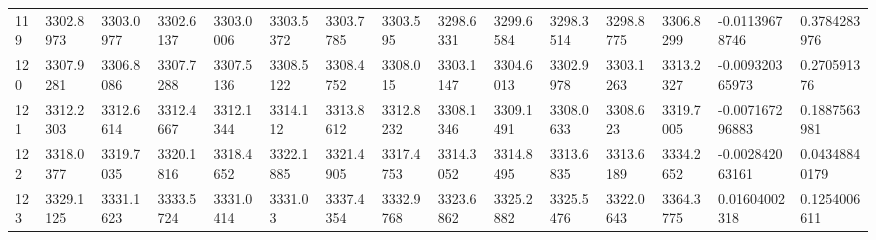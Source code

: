 \begin{landscape}
{\begin{longtable}{@{}lllllllllllllll@{}}
		119                                          & 3302.8973                & 3303.0977                & 3302.6137                & 3303.0006                & 3303.5372                & 3303.7785                & 3303.595                 & 3298.6331                & 3299.6584                & 3298.3514                & 3298.8775                & 3306.8299                & -0.01139678746                                                         & 0.3784283976                                    \\
		120                                          & 3307.9281                & 3306.8086                & 3307.7288                & 3307.5136                & 3308.5122                & 3308.4752                & 3308.015                 & 3303.1147                & 3304.6013                & 3302.9978                & 3303.1263                & 3313.2327                & -0.009320365973                                                        & 0.270591376                                     \\
		121                                          & 3312.2303                & 3312.6614                & 3312.4667                & 3312.1344                & 3314.112                 & 3313.8612                & 3312.8232                & 3308.1346                & 3309.1491                & 3308.0633                & 3308.623                 & 3319.7005                & -0.007167296883                                                        & 0.1887563981                                    \\
		122                                          & 3318.0377                & 3319.7035                & 3320.1816                & 3318.4652                & 3322.1885                & 3321.4905                & 3317.4753                & 3314.3052                & 3314.8495                & 3313.6835                & 3313.6189                & 3334.2652                & -0.002842063161                                                        & 0.04348840179                                   \\
		123                                          & 3329.1125                & 3331.1623                & 3333.5724                & 3331.0414                & 3331.03                  & 3337.4354                & 3332.9768                & 3323.6862                & 3325.2882                & 3325.5476                & 3322.0643                & 3364.3775                & 0.01604002318                                                          & 0.1254006611                                    \\

\end{longtable}}
\end{landscape}
